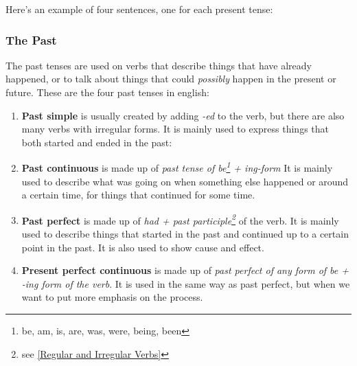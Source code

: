 Here's an example of four sentences, one for each present tense:

\begin{center}
\end{center}

\subsubsection{The Past}
The past tenses are used on verbs that describe things that have already happened, or to talk about things that could \textit{possibly} happen in the present or future. These are the four past tenses in english:

\begin{enumerate}
    \item \textbf{Past simple} is usually created by adding \textit{-ed} to the verb, but there are also many verbs with irregular forms. It is mainly used to express things that both started and ended in the past:
    \item \textbf{Past continuous} is made up of \textit{past tense of be\footnote{be, am, is, are, was, were, being, been} + ing-form} It is mainly used to describe what was going on when something else happened or around a certain time, for things that continued for some time.
    \item \textbf{Past perfect} is made up of \textit{had + past participle\footnote{see \ref{Regular and Irregular Verbs}}} of the verb. It is mainly used to describe things that started in the past and continued up to a certain point in the past. It is also used to show cause and effect.
    \item \textbf{Present perfect continuous} is made up of \textit{past perfect of any form of be + -ing form of the verb}. It is used in the same way as past perfect, but when we want to put more emphasis on the process.
\end{enumerate}

\begin{center}
\end{center}

